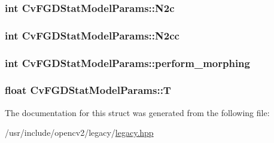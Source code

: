 \hypertarget{structCvFGDStatModelParams_afb5e452daa801b83378b8fee545c5162}{
\subsubsection[{N2c}]{\setlength{\rightskip}{0pt plus 5cm}int Cv\-F\-G\-D\-Stat\-Model\-Params\-::\-N2c}}\label{structCvFGDStatModelParams_afb5e452daa801b83378b8fee545c5162}
\hypertarget{structCvFGDStatModelParams_ae3e5c442d4f636c39d0180efd6910070}{
\subsubsection[{N2cc}]{\setlength{\rightskip}{0pt plus 5cm}int Cv\-F\-G\-D\-Stat\-Model\-Params\-::\-N2cc}}\label{structCvFGDStatModelParams_ae3e5c442d4f636c39d0180efd6910070}
\hypertarget{structCvFGDStatModelParams_ad22b9089be11b542b4868ba3dd1713d1}{
\subsubsection[{perform\-\_\-morphing}]{\setlength{\rightskip}{0pt plus 5cm}int Cv\-F\-G\-D\-Stat\-Model\-Params\-::perform\-\_\-morphing}}\label{structCvFGDStatModelParams_ad22b9089be11b542b4868ba3dd1713d1}
\hypertarget{structCvFGDStatModelParams_ae622017985c5bb40a27fdb8fbc5aad95}{
\subsubsection[{T}]{\setlength{\rightskip}{0pt plus 5cm}float Cv\-F\-G\-D\-Stat\-Model\-Params\-::\-T}}\label{structCvFGDStatModelParams_ae622017985c5bb40a27fdb8fbc5aad95}


The documentation for this struct was generated from the following file\-:\begin{DoxyCompactItemize}
\item 
/usr/include/opencv2/legacy/\hyperlink{legacy_8hpp}{legacy.\-hpp}\end{DoxyCompactItemize}
